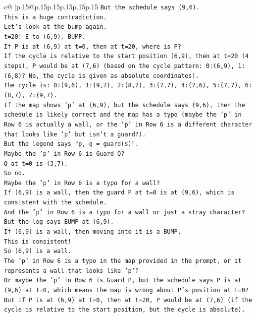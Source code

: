 \documentclass{article}
\begin{document}
{\begin{supertabular}{c@{$\;$}|p{.15\linewidth}@{}p{.15\linewidth}p{.15\linewidth}p{.15\linewidth}p{.15\linewidth}p{.15\linewidth}}
{{{\texttt{But the schedule says (9,6).} \\
\texttt{This is a huge contradiction.} \\
\texttt{Let's look at the bump again.} \\
\texttt{t=20: E to (6,9). BUMP.} \\
\texttt{If P is at (6,9) at t=0, then at t=20, where is P?} \\
\texttt{If the cycle is relative to the start position (6,9), then at t=20 (4 steps), P would be at (7,6) (based on the cycle pattern: 0:(6,9), 1:(6,8)? No, the cycle is given as absolute coordinates).} \\
\texttt{The cycle is: 0:(9,6), 1:(9,7), 2:(8,7), 3:(7,7), 4:(7,6), 5:(7,7), 6:(8,7), 7:(9,7).} \\
\texttt{If the map shows 'p' at (6,9), but the schedule says (9,6), then the schedule is likely correct and the map has a typo (maybe the 'p' in Row 6 is actually a wall, or the 'p' in Row 6 is a different character that looks like 'p' but isn't a guard?).} \\
\texttt{But the legend says "p, q = guard(s)".} \\
\texttt{Maybe the 'p' in Row 6 is Guard Q?} \\
\texttt{Q at t=0 is (3,7).} \\
\texttt{So no.} \\
\texttt{Maybe the 'p' in Row 6 is a typo for a wall?} \\
\texttt{If (6,9) is a wall, then the guard P at t=0 is at (9,6), which is consistent with the schedule.} \\
\texttt{And the 'p' in Row 6 is a typo for a wall or just a stray character?} \\
\texttt{But the log says BUMP at (6,9).} \\
\texttt{If (6,9) is a wall, then moving into it is a BUMP.} \\
\texttt{This is consistent!} \\
\texttt{So (6,9) is a wall.} \\
\texttt{The 'p' in Row 6 is a typo in the map provided in the prompt, or it represents a wall that looks like 'p'?} \\
\texttt{Or maybe the 'p' in Row 6 is Guard P, but the schedule says P is at (9,6) at t=0, which means the map is wrong about P's position at t=0?} \\
\texttt{But if P is at (6,9) at t=0, then at t=20, P would be at (7,6) (if the cycle is relative to the start position, but the cycle is absolute).} \\
}}}
\end{supertabular}}
\end{document}
